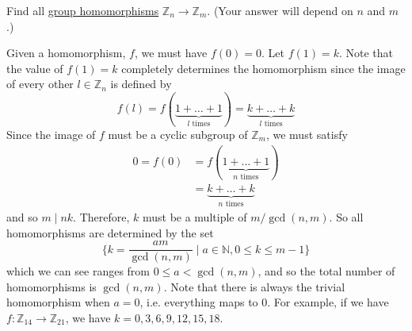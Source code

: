   \begin{exercise}[Assigned]
    Find all \hyperref[def:group-homomorphism]{group homomorphisms} $\mathbb{Z}_n \to \mathbb{Z}_m$. (Your answer will depend on $n$ and $m$.) 
  \end{exercise}
  \begin{solution}
    Given a homomorphism, $f$, we must have $f(0) = 0$. Let $f(1) = k$. Note that the value of $f(1) = k$ completely determines the homomorphism since the image of every other $l \in \mathbb{Z}_n$ is defined by 
    \begin{equation}
      f(l) = f(\underbrace{1 + \ldots + 1}_{l \text{ times}}) = \underbrace{k + \ldots + k}_{l \text{ times}}
    \end{equation}
    Since the image of $f$ must be a cyclic subgroup of $\mathbb{Z}_m$, we must satisfy 
    \begin{align}
      0 = f(0) & = f(\underbrace{1 + \ldots + 1}_{n \text{ times}}) \\
               & = \underbrace{k + \ldots + k}_{n \text{ times}} 
    \end{align}
    and so $m \mid nk$. Therefore, $k$ must be a multiple of $m/\gcd(n, m)$. So all homomorphisms are determined by the set 
    \begin{equation}
      \bigg\{ k = \frac{a m}{\gcd(n, m)} \; \bigg| \; a \in \mathbb{N}, 0 \leq k \leq m-1 \bigg\}
    \end{equation}
    which we can see ranges from $0 \leq a < \gcd(n, m)$, and so the total number of homomorphisms is $\gcd(n, m)$. Note that there is always the trivial homomorphism when $a = 0$, i.e. everything maps to $0$. For example, if we have $f: \mathbb{Z}_{14} \to \mathbb{Z}_{21}$, we have $k = 0, 3, 6, 9, 12, 15, 18$. 
  \end{solution}

